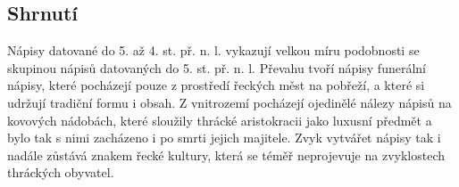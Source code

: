
\subsection[shrnutí-6]{Shrnutí}

Nápisy datované do 5. až 4. st. př. n. l. vykazují velkou míru podobnosti se skupinou nápisů datovaných do 5. st. př. n. l. Převahu tvoří nápisy funerální nápisy, které pocházejí pouze z prostředí řeckých měst na pobřeží, a které si udržují tradiční formu i obsah. Z vnitrozemí pocházejí ojedinělé nálezy nápisů na kovových nádobách, které sloužily thrácké aristokracii jako luxusní předmět a bylo tak s nimi zacházeno i po smrti jejich majitele. Zvyk vytvářet nápisy tak i nadále zůstává znakem řecké kultury, která se téměř neprojevuje na zvyklostech thráckých obyvatel.

